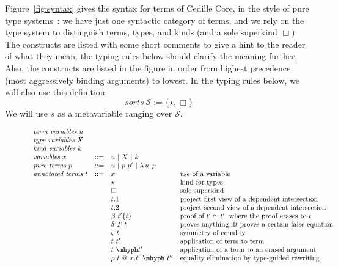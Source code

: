 \documentclass{article}
\newcommand{\absu}[3]{{#1}\, #2.\, #3}
\begin{document}
Figure~\ref{fig:syntax} gives the syntax for terms of Cedille Core, in
the style of pure type systems~\cite{B92}: we have just one syntactic
category of terms, and we rely on the type system to distinguish
terms, types, and kinds (and a sole superkind $\Box$).  The constructs
are listed with some short comments to give a hint to the reader of
what they mean; the typing rules below should clarify the meaning
further.  Also, the constructs are listed in the figure in order from
highest precedence (most aggressively binding arguments) to lowest.
In the typing rules below, we will also use this definition:
\[
\textit{sorts}\ \mathcal{S} := \{ \star , \Box \}
\]
\noindent We will use $s$ as a metavariable ranging over $\mathcal{S}$.

\begin{figure}
\[
\begin{array}{llll}
  \textit{term variables}\ u & \ & \ &\ \\
  \textit{type variables}\ X & \ & \ &\ \\
  \textit{kind variables}\ k & \ & \ &\ \\
  \textit{variables}\ x & ::= & u\ |\ X\ |\ k &\ \\  
  \textit{pure terms}\ p & ::= & u\ |\ p\ p'\ |\ \absu{\lambda}{u}{p} &\ \\
  \textit{annotated terms}\ t & ::= & x\ & \textnormal{use of a variable} \\
  \ &\ & \star&\textnormal{kind for types}\\
  \ &\ & \Box&\textnormal{sole superkind} \\
  \ &\ & t.1 & \textnormal{project first view of a dependent intersection}\\
  \ &\ & t.2 & \textnormal{project second view of a dependent intersection}\\
  \ &\ & \beta\ t'\{t\} &\textnormal{proof of }t' \simeq t'\textnormal{, where the proof erases to }t  \\
  \ &\ & \delta\ T\ t &\textnormal{proves anything if}t\textnormal{ proves a certain false equation}  \\
  \ &\ & \varsigma\ t &\textnormal{symmetry of equality}  \\
  \ &\ & t\ t' & \textnormal{application of term to term}\\
  \ &\ & t\ \mhyph t' & \textnormal{application of a term to an erased argument}\\
  \ &\ & \rho\ t\ @\ x.t'\ \mhyph\ t''&\textnormal{equality elimination by type-guided rewriting}  \\ 

\end{array}\]
\end{figure}
\end{document}
